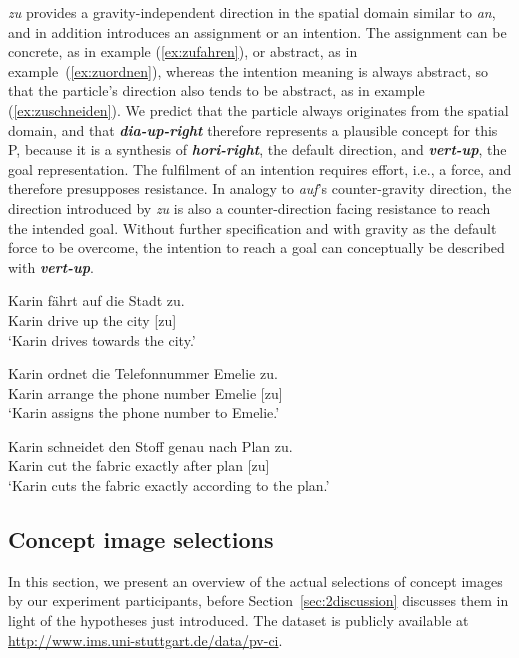 \documentclass[output=paper]{langsci/langscibook}
\newcommand{\textci}[1]{\textit{\textbf{#1}}}
\begin{document}
\textit{zu} provides a gravity-independent direction in the spatial
domain similar to \textit{an}, and in addition introduces an
assignment or an intention. The assignment can be concrete, as in
example (\ref{ex:zufahren}), or abstract, as in
example~(\ref{ex:zuordnen}), whereas the intention meaning is always
abstract, so that the particle's direction also tends to be abstract,
as in example (\ref{ex:zuschneiden}). We predict that the particle
always originates from the spatial domain, and that
\textci{dia-up-right} therefore represents a plausible concept for
this P, because it is a synthesis of \textci{hori-right}, the default
direction, and \textci{vert-up}, the goal representation. The
fulfilment of an intention requires effort, i.e., a force, and
therefore presupposes resistance. In analogy to \textit{auf}'s
counter-gravity direction, the direction introduced by \textit{zu} is
also a counter-direction facing resistance to reach the intended
goal. Without further specification and with gravity as the default
force to be overcome, the intention to reach a goal can conceptually
be described with \textci{vert-up}.

\ea\label{ex:zufahren}
\gll Karin fährt auf die Stadt zu.\\
Karin drive up the city [zu]\\
\glt `Karin drives towards the city.'
\z

\ea\label{ex:zuordnen}
\gll Karin ordnet die Telefonnummer Emelie zu.\\
Karin arrange the {phone number} Emelie [zu]\\
\glt `Karin assigns the phone number to Emelie.'
\z

\ea\label{ex:zuschneiden}
\gll Karin schneidet den Stoff genau nach Plan zu.\\
Karin cut the fabric exactly after plan [zu]\\
\glt `Karin cuts the fabric exactly according to the plan.'
\z


\vspace{+3mm}
\subsection{Concept image selections}

In this section, we present an overview of the actual selections of
concept images by our experiment participants, before
Section~\ref{sec:2discussion} discusses them in light of the hypotheses
just introduced. The dataset is publicly available at
\url{http://www.ims.uni-stuttgart.de/data/pv-ci}.
\end{document}
